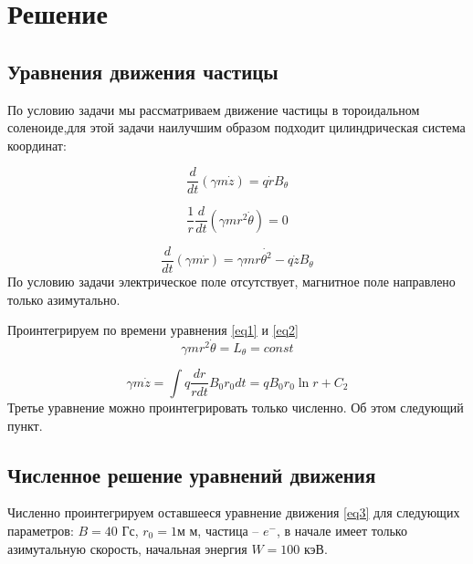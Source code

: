 \section{Решение}
\subsection{Уравнения движения частицы}
По условию задачи мы рассматриваем движение частицы в тороидальном соленоиде,для этой задачи наилучшим образом подходит цилиндрическая система координат:


\begin{equation} 
    \frac{d}{dt}(\gamma m \dot{z}) = q \dot{r} B_{\theta} \label{eq1}
\end{equation}

\begin{equation}
    \frac{1}{r} \frac{d}{dt} (\gamma m r^2 \dot{\theta}) = 0 \label{eq2}   
\end{equation}

\begin{equation}
    \frac{d}{dt}(\gamma m \dot{r}) = \gamma mr \dot{\theta^2} - q \dot{z} B_{\theta}   \label{eq3}
\end{equation}
По условию задачи электрическое поле отсутствует, магнитное поле направлено только азимутально. 
\par
Проинтегрируем по времени уравнения \eqref{eq1} и \eqref{eq2}
\begin{equation}
     \gamma m r^2 \dot{\theta} = L_{\theta} = const
\end{equation}

\begin{equation}
    \gamma m \dot{z} = \int{q \frac{dr}{rdt}B_0 r_0}dt = q B_0 r_0 \ln{r} + C_2
\end{equation}
Третье уравнение можно проинтегрировать только численно. Об этом следующий пункт.
\newpage

\subsection{Численное решение уравнений движения}

Численно проинтегрируем оставшееся уравнение движения \eqref{eq3} для следующих параметров: \(B = 40 \) Гс,  \(r_0 = 1 м\) м, частица – \(e^-\), в начале имеет только азимутальную скорость, начальная энергия \(W = 100 \) кэВ. 

